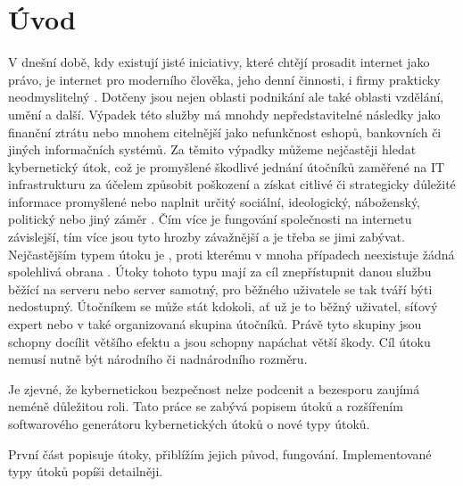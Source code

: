 \chapter*{Úvod}
{}


V dnešní době, kdy existují jisté iniciativy, které chtějí prosadit internet jako právo, je internet 
pro moderního člověka, jeho denní činnosti, i firmy prakticky neodmyslitelný \cite{pirati_internet}. 
Dotčeny jsou nejen oblasti podnikání ale také oblasti vzdělání, umění a další. Výpadek této služby má 
mnohdy nepředstavitelné následky jako finanční ztrátu nebo mnohem citelnější jako nefunkčnost eshopů, 
bankovních či jiných informačních systémů. Za těmito výpadky můžeme nejčastěji hledat kybernetický útok, 
což je promyšlené škodlivé jednání útočníků zaměřené na  IT  infrastrukturu  za  účelem  způsobit 
poškození  a  získat  citlivé  či  strategicky  důležité 
informace promyšlené nebo naplnit určitý sociální, ideologický, náboženský, politický nebo jiný záměr 
\cite{Jirasek2012}. Čím více je fungování společnosti na internetu závislejší, tím více jsou tyto hrozby 
závažnější a je třeba se jimi zabývat. Nejčastějším typem útoku je , proti kterému 
v mnoha případech neexistuje  žádná spolehlivá obrana \cite{akamai_q2_2017}. Útoky tohoto typu mají 
za cíl znepřístupnit danou službu běžící na serveru nebo server samotný, pro běžného uživatele se tak 
tváří býti nedostupný. Útočníkem se může stát kdokoli, ať už je to běžný uživatel, síťový expert nebo 
v také organizovaná skupina útočníků. Právě tyto skupiny jsou schopny docílit většího efektu a jsou 
schopny napáchat větší škody. Cíl útoku nemusí nutně být národního či nadnárodního rozměru.

Je zjevné, že kybernetickou bezpečnost nelze podcenit a bezesporu zaujímá neméně důležitou roli. Tato 
práce se zabývá popisem  útoků a rozšířením softwarového generátoru kybernetických útoků 
o nové typy útoků.

První část popisuje  útoky, přiblížím jejich původ, fungování. Implementované typy útoků 
popíši detailněji. 